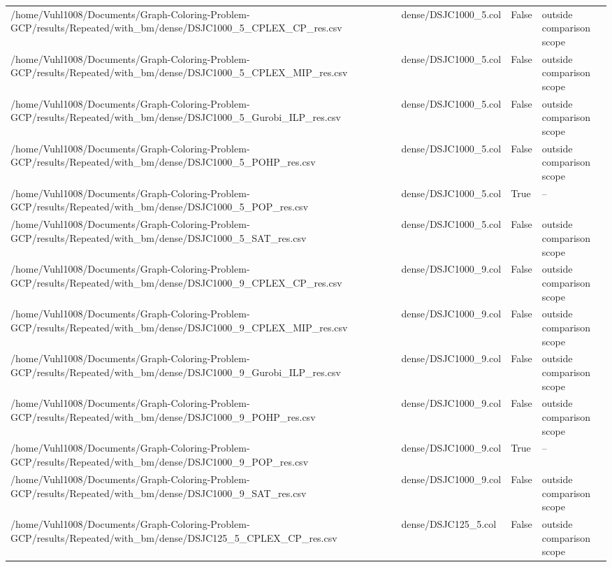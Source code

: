 \begin{table}[htbp]
\begin{tabular}{llll}
/home/Vuhl1008/Documents/Graph-Coloring-Problem-GCP/results/Repeated/with\_bm/dense/DSJC1000\_5\_CPLEX\_CP\_res.csv & dense/DSJC1000\_5.col & False & outside comparison scope \\
/home/Vuhl1008/Documents/Graph-Coloring-Problem-GCP/results/Repeated/with\_bm/dense/DSJC1000\_5\_CPLEX\_MIP\_res.csv & dense/DSJC1000\_5.col & False & outside comparison scope \\
/home/Vuhl1008/Documents/Graph-Coloring-Problem-GCP/results/Repeated/with\_bm/dense/DSJC1000\_5\_Gurobi\_ILP\_res.csv & dense/DSJC1000\_5.col & False & outside comparison scope \\
/home/Vuhl1008/Documents/Graph-Coloring-Problem-GCP/results/Repeated/with\_bm/dense/DSJC1000\_5\_POHP\_res.csv & dense/DSJC1000\_5.col & False & outside comparison scope \\
/home/Vuhl1008/Documents/Graph-Coloring-Problem-GCP/results/Repeated/with\_bm/dense/DSJC1000\_5\_POP\_res.csv & dense/DSJC1000\_5.col & True & -- \\
/home/Vuhl1008/Documents/Graph-Coloring-Problem-GCP/results/Repeated/with\_bm/dense/DSJC1000\_5\_SAT\_res.csv & dense/DSJC1000\_5.col & False & outside comparison scope \\
/home/Vuhl1008/Documents/Graph-Coloring-Problem-GCP/results/Repeated/with\_bm/dense/DSJC1000\_9\_CPLEX\_CP\_res.csv & dense/DSJC1000\_9.col & False & outside comparison scope \\
/home/Vuhl1008/Documents/Graph-Coloring-Problem-GCP/results/Repeated/with\_bm/dense/DSJC1000\_9\_CPLEX\_MIP\_res.csv & dense/DSJC1000\_9.col & False & outside comparison scope \\
/home/Vuhl1008/Documents/Graph-Coloring-Problem-GCP/results/Repeated/with\_bm/dense/DSJC1000\_9\_Gurobi\_ILP\_res.csv & dense/DSJC1000\_9.col & False & outside comparison scope \\
/home/Vuhl1008/Documents/Graph-Coloring-Problem-GCP/results/Repeated/with\_bm/dense/DSJC1000\_9\_POHP\_res.csv & dense/DSJC1000\_9.col & False & outside comparison scope \\
/home/Vuhl1008/Documents/Graph-Coloring-Problem-GCP/results/Repeated/with\_bm/dense/DSJC1000\_9\_POP\_res.csv & dense/DSJC1000\_9.col & True & -- \\
/home/Vuhl1008/Documents/Graph-Coloring-Problem-GCP/results/Repeated/with\_bm/dense/DSJC1000\_9\_SAT\_res.csv & dense/DSJC1000\_9.col & False & outside comparison scope \\
/home/Vuhl1008/Documents/Graph-Coloring-Problem-GCP/results/Repeated/with\_bm/dense/DSJC125\_5\_CPLEX\_CP\_res.csv & dense/DSJC125\_5.col & False & outside comparison scope \\

\end{tabular}
\end{table}

